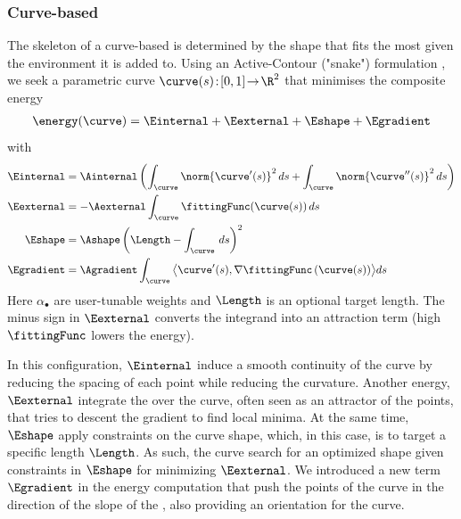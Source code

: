 \subsubsection{Curve-based }
The skeleton of a curve-based  is determined by the shape that fits the most given the environment it is added to. 
Using an Active-Contour ("snake") formulation \cite{Kass1988}, we seek a parametric curve $\curve(s)\!:\![0,1]\!\to\!\R^{2}$ that minimises the composite energy  
\begin{align}
    \energy(\curve) = \Einternal + \Eexternal + \Eshape + \Egradient
\end{align}
with
\begin{align}
    \label{eq:env-obj-snake-energy-equation-internal}
    \Einternal &= \Ainternal \left( \int_{\curve}{ \norm{\curve'(s)}^2 \, ds} + \int_{\curve}{ \norm{\curve''(s)}^2 \, ds}  \right) \\
    \label{eq:env-obj-snake-energy-equation-external}
    \Eexternal &= -\Aexternal \int_{\curve}{ \fittingFunc(\curve(s)) \, ds } \\
    \label{eq:env-obj-snake-energy-equation-shape}
    \Eshape    &= \Ashape \left( \Length - \int_{\curve}{ \, ds } \right)^2 \\
    \label{eq:env-obj-snake-energy-equation-gradient}
    \Egradient &= \Agradient \int_{\curve}{\bigl\langle \curve'(s),\nabla\fittingFunc\left(\curve(s)\right)\bigr\rangle ds}
\end{align}
Here $\alpha_{\bullet}$ are user-tunable weights and $\Length$ is an optional target length. The minus sign in $\Eexternal$ converts the integrand into an attraction term (high $\fittingFunc$ lowers the energy).

In this configuration, $\Einternal$ induce a smooth continuity of the curve by reducing the spacing of each point while reducing the curvature. Another energy, $\Eexternal$ integrate the  over the curve, often seen as an attractor of the points, that tries to descent the gradient to find local minima. At the same time, $\Eshape$ apply constraints on the curve shape, which, in this case, is to target a specific length $\Length$. As such, the curve search for an optimized shape given constraints in $\Eshape$ for minimizing $\Eexternal$. We introduced a new term $\Egradient$ in the energy computation that push the points of the curve in the direction of the slope of the , also providing an orientation for the curve.

